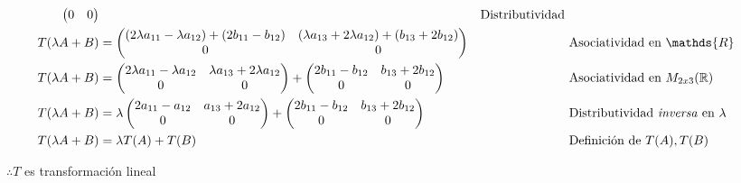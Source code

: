 \documentclass[letterpaper]{article}
\newcommand{\R}{\mathds{R}}
\renewcommand{\*}{\cdot}
\theoremstyle{definition}
\begin{document}
\begin{align*}
\begin{pmatrix}
		0& 0
		\end{pmatrix} && \text{Distributividad } \\
		T(\lambda A + B) &= \begin{pmatrix}
		(2\lambda a_{11} -\lambda a_{12}) + (2b_{11} - b_{12})  &(\lambda a_{13}+ 2\lambda a_{12} )+  (b_{13} + 2b_{12})\\
		0& 0
		\end{pmatrix} && \text{Asociatividad en $ \R $ } \\
		T(\lambda A + B) &= \begin{pmatrix}
		2\lambda a_{11} -\lambda a_{12} & \lambda a_{13}+ 2\lambda a_{12}\\
		0 & 0 
		\end{pmatrix} + \begin{pmatrix}
		2b_{11} - b_{12}  &  b_{13} + 2b_{12}\\
		0& 0
		\end{pmatrix} && \text{Asociatividad en $  M_{2x3}(\mathbb{R}) $ } \\
		T(\lambda A + B) &= \lambda \begin{pmatrix}
		2a_{11} - a_{12} &  a_{13}+ 2 a_{12}\\
		0 & 0 
		\end{pmatrix} + \begin{pmatrix}
		2b_{11} - b_{12}  &  b_{13} + 2b_{12}\\
		0& 0
		\end{pmatrix} && \text{Distributividad \textit{inversa} en $ \lambda $ } \\
		T(\lambda A + B) &= \lambda T(A) + T(B) && \text{Definición de $ T(A), T(B) $ } \\
	\end{align*}
	\begin{center}
		$ \therefore T $ es transformación lineal
	\end{center}	
		
\end{document}
